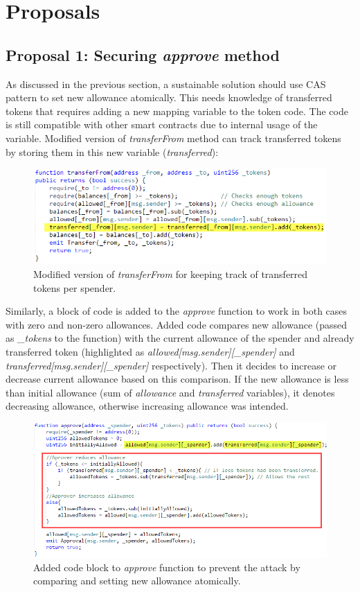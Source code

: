 
\section{Proposals}
\subsection{Proposal 1: Securing \textit{approve} method}
As discussed in the previous section, a sustainable solution should use CAS pattern\cite{Ref06} to set new allowance atomically. This needs knowledge of transferred tokens that requires adding a new mapping variable to the token code. The code is still compatible with other smart contracts due to internal usage of the variable. Modified version of \textit{transferFrom} method can track transferred tokens by storing them in this new variable (\textit{transferred}):
\begin{figure}[H]
	\centering
	\includegraphics[width=1.0\linewidth]{figures/multiple_withdrawal_14.png}
	\caption{Modified version of \textit{transferFrom} for keeping track of transferred tokens per spender.}
\end{figure}
\noindent Similarly, a block of code is added to the \textit{approve} function to work in both cases with zero and non-zero allowances. Added code compares new allowance (passed as \textit{\_tokens} to the function) with the current allowance of the spender and already transferred token (highlighted as \textit{allowed[msg.sender][\_spender]} and \textit{transferred[msg.sender][\_spender]} respectively). Then it decides to increase or decrease current allowance based on this comparison. If the new allowance is less than initial allowance (sum of \textit{allowance} and \textit{transferred} variables), it denotes decreasing allowance, otherwise increasing allowance was intended.
\begin{figure}[H]
	\centering
	\includegraphics[width=1.0\linewidth]{figures/multiple_withdrawal_15.png}
	\caption{Added code block to \textit{approve} function to prevent the attack by comparing and setting new allowance atomically.}
\end{figure}
